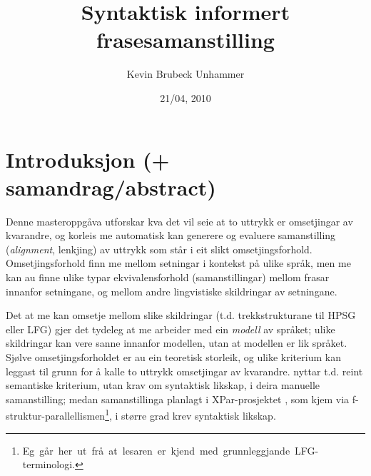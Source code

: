 \documentclass[11pt,a4paper,oneside,draft]{book}
\title{Syntaktisk informert frasesamanstilling }
\author{Kevin Brubeck Unhammer}
\date{21/04, 2010}
\begin{document}
\maketitle

\setcounter{tocdepth}{4}
\tableofcontents
\vspace*{1cm}


\listoffixmes
\chapter{Introduksjon (+ samandrag/abstract)}
\label{sec-1}

Denne masteroppgåva utforskar kva det vil seie at to uttrykk er
omsetjingar av kvarandre, og korleis me automatisk kan generere og
evaluere samanstilling (\emph{alignment}, lenkjing) av uttrykk som står i
eit slikt omsetjingsforhold. Omsetjingsforhold finn me mellom
setningar i kontekst på ulike språk, men me kan au finne ulike typar
ekvivalensforhold (samanstillingar) mellom frasar innanfor setningane,
og mellom andre lingvistiske skildringar av setningane.

Det at me kan omsetje mellom slike skildringar (t.d. trekkstrukturane
til HPSG eller LFG) gjer det tydeleg at me arbeider med ein \emph{modell} av
språket; ulike skildringar kan vere sanne innanfor modellen, utan at
modellen er lik språket. Sjølve omsetjingsforholdet er au ein
teoretisk storleik, og ulike kriterium kan leggast til grunn for å
kalle to uttrykk omsetjingar av kvarandre. \citet{samuelsson2006pap}
nyttar t.d. reint semantiske kriterium, utan krav om syntaktisk
likskap, i deira manuelle samanstilling; medan samanstillinga planlagt
i XPar-prosjektet \citep{xpar2008rcn}, som kjem via
f-struktur-parallellismen\footnote{Eg~går~her~ut~frå~at~lesaren~er~kjend~med~grunnleggjande~LFG-terminologi.},
i større grad krev syntaktisk likskap.
\end{document}
